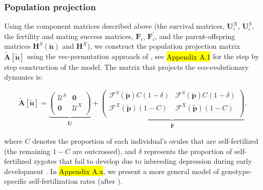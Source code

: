 \documentclass[11pt]{article}
\def\mbf#1{\mathbf{#1}}
\def\mcal#1{\mathcal{#1}}
\begin{document}
\subsubsection*{Population projection}
Using the component matrices described above (the survival matrices, $\mathbf{U}^X_i$, $\mathbf{U}^S_i$, the fertility and mating success matrices, $\mathbf{F}_i$, $\mathbf{F}^\prime_i$, and the parent-offspring matrices $\mbf{H}^S(\tilde{\mbf{n}})$ and $\mbf{H}^X$), we construct the population projection matrix $\tilde{\mbf{A}}[\tilde{\mbf{n}}]$ using the vec-permutation approach of \citet{CaswellEtAl2018}, see \hl{Appendix A.1} for the step by step construction of the model. The matrix that projects the eco-evolutionary dynamics is:
\begin{linenomath*}
\begin{equation} \label{eq:Atilde}
	\tilde{\mbf{A}}[\tilde{\mbf{n}}] = 
			\underbrace{\left(
			\begin{array}{c|c}
				\mcal{U}^S & \mbf{0} \\ \hline
				\mbf{0} & \mcal{U}^X \\
			\end{array} \right)}_{\tilde{\mbf{U}}} + 
			\underbrace{\left(
			\begin{array}{c|c}
				\mcal{F}^S(\tilde{\mbf{p}}) C(1 - \delta) & \mcal{F}^S(\tilde{\mbf{p}}) C(1 - \delta) \\ \hline
				\mcal{F}^X(\tilde{\mbf{p}}) (1 - C) & \mcal{F}^X(\tilde{\mbf{p}}) (1 - C)\\
			\end{array} \right)}_{\tilde{\mbf{F}}},
\end{equation}
\end{linenomath*}
where $C$ denotes the proportion of each individual's ovules that are self-fertilized (the remaining $1 - C$ are outcrossed), and  $\delta$ represents the proportion of self-fertilized zygotes that fail to develop due to inbreeding depression during early development \citep{Charlesworth1987}. In \hl{Appendix A.x}, we present a more general model of genotype-specific self-fertilization rates (after \citealt{JordanConnallon2014}). 
\end{document}
